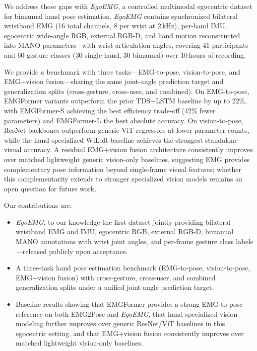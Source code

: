 \documentclass{article}
\newcommand{\dataset}{\textit{EgoEMG}}
\newcommand{\model}{EMGFormer}
\begin{document}
We address these gaps with \dataset{}, a controlled multimodal egocentric dataset for bimanual hand pose estimation. \dataset{} contains synchronized bilateral wristband EMG (16 total channels, 8 per wrist at 2\,kHz), per-hand IMU, egocentric wide-angle RGB, external RGB-D, and hand motion reconstructed into MANO parameters~\citep{mano} with wrist articulation angles, covering 41 participants and 60 gesture classes (30 single-hand, 30 bimanual) over 10\,hours of recording.

We provide a benchmark with three tasks---EMG-to-pose, vision-to-pose, and EMG+vision fusion---sharing the same joint-angle prediction target and generalization splits (cross-gesture, cross-user, and combined). On EMG-to-pose, \model{} variants outperform the prior TDS+LSTM baseline by up to 22\%, with \model{}-S achieving the best efficiency trade-off (42\% fewer parameters) and \model{}-L the best absolute accuracy. On vision-to-pose, ResNet backbones outperform generic ViT regressors at lower parameter counts, while the hand-specialized WiLoR baseline achieves the strongest standalone visual accuracy. A residual EMG+vision fusion architecture consistently improves over matched lightweight generic vision-only baselines, suggesting EMG provides complementary pose information beyond single-frame visual features; whether this complementarity extends to stronger specialized vision models remains an open question for future work.

Our contributions are:
\begin{itemize}[leftmargin=1.5em,nosep]
    \item \dataset{}, to our knowledge the first dataset jointly providing bilateral wristband EMG and IMU, egocentric RGB, external RGB-D, bimanual MANO annotations with wrist joint angles, and per-frame gesture class labels---released publicly upon acceptance.
    \item A three-task hand pose estimation benchmark (EMG-to-pose, vision-to-pose, EMG+vision fusion) with cross-gesture, cross-user, and combined generalization splits under a unified joint-angle prediction target.
    \item Baseline results showing that \model{} provides a strong EMG-to-pose reference on both EMG2Pose and \dataset{}, that hand-specialized vision modeling further improves over generic ResNet/ViT baselines in this egocentric setting, and that EMG+vision fusion consistently improves over matched lightweight vision-only baselines.
\end{itemize}  
\end{document}
